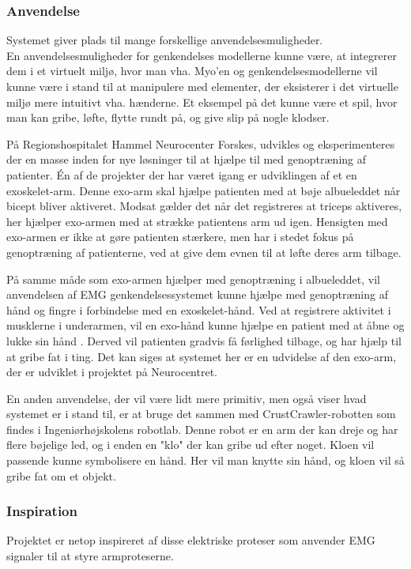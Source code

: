 \subsubsection{Anvendelse}
Systemet giver plads til mange forskellige anvendelsesmuligheder.\\

En anvendelsesmuligheder for genkendelses modellerne kunne være, at integrerer dem i et virtuelt miljø, hvor man vha. Myo’en og genkendelsesmodellerne vil kunne være i stand til at manipulere med elementer, der eksisterer i det virtuelle miljø mere intuitivt vha. hænderne. Et eksempel på det kunne være et spil, hvor man kan gribe, løfte, flytte rundt på, og give slip på nogle klodser.

På Regionshospitalet Hammel Neurocenter Forskes, udvikles og eksperimenteres der en masse inden for nye løsninger til at hjælpe til med genoptræning af patienter. Én af de projekter der har været igang er udviklingen af et en exoskelet-arm. Denne exo-arm skal hjælpe patienten med at bøje albueleddet når bicept bliver aktiveret. Modsat gælder det når det registreres at triceps aktiveres, her hjælper exo-armen med at strække patientens arm ud igen. Hensigten med exo-armen er ikke at gøre patienten stærkere, men har i stedet fokus på genoptræning af patienterne, ved at give dem evnen til at løfte deres arm tilbage.

På samme måde som exo-armen hjælper med genoptræning i albueleddet, vil anvendelsen af EMG genkendelsessystemet kunne hjælpe med genoptræning af hånd og fingre i forbindelse med en exoskelet-hånd. Ved at registrere aktivitet i musklerne i underarmen, vil en exo-hånd kunne hjælpe en patient med at åbne og lukke sin hånd . Derved vil patienten gradvis få førlighed tilbage, og har hjælp til at gribe fat i ting. Det kan siges at systemet her er en udvidelse af den exo-arm, der er udviklet i projektet på Neurocentret.

En anden anvendelse, der vil være lidt mere primitiv, men også viser hvad systemet er i stand til, er at bruge det sammen med CrustCrawler-robotten som findes i Ingeniørhøjskolens robotlab. Denne robot er en arm der kan dreje og har flere bøjelige led, og i enden en "klo" der kan gribe ud efter noget. Kloen vil passende kunne symbolisere en hånd. Her vil man knytte sin hånd, og kloen vil så gribe fat om et objekt.

\subsubsection{Inspiration}
Projektet er netop inspireret af disse elektriske proteser som anvender EMG signaler til at styre armproteserne.

